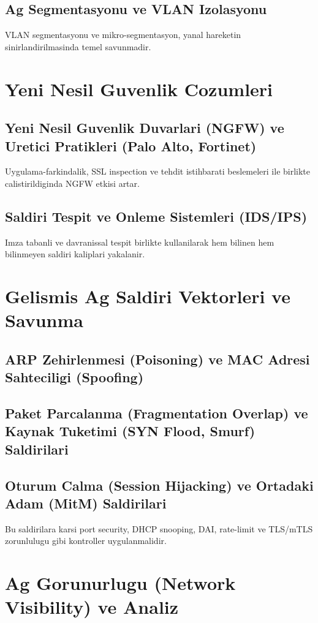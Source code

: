 \subsection{Ag Segmentasyonu ve VLAN Izolasyonu}
VLAN segmentasyonu ve mikro-segmentasyon, yanal hareketin sinirlandirilmasinda temel savunmadir.

\section{Yeni Nesil Guvenlik Cozumleri}
\subsection{Yeni Nesil Guvenlik Duvarlari (NGFW) ve Uretici Pratikleri (Palo Alto, Fortinet)}
Uygulama-farkindalik, SSL inspection ve tehdit istihbarati beslemeleri ile birlikte calistirildiginda NGFW etkisi artar.

\subsection{Saldiri Tespit ve Onleme Sistemleri (IDS/IPS)}
Imza tabanli ve davranissal tespit birlikte kullanilarak hem bilinen hem bilinmeyen saldiri kaliplari yakalanir.

\section{Gelismis Ag Saldiri Vektorleri ve Savunma}
\subsection{ARP Zehirlenmesi (Poisoning) ve MAC Adresi Sahteciligi (Spoofing)}
\subsection{Paket Parcalanma (Fragmentation Overlap) ve Kaynak Tuketimi (SYN Flood, Smurf) Saldirilari}
\subsection{Oturum Calma (Session Hijacking) ve Ortadaki Adam (MitM) Saldirilari}
Bu saldirilara karsi port security, DHCP snooping, DAI, rate-limit ve TLS/mTLS zorunlulugu gibi kontroller uygulanmalidir.

\section{Ag Gorunurlugu (Network Visibility) ve Analiz}
